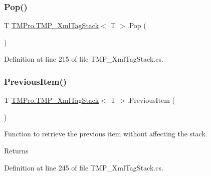 \mbox{\label{struct_t_m_pro_1_1_t_m_p___xml_tag_stack_a5d638de23cccb39bfb43391466559628}} 
\subsubsection{\texorpdfstring{Pop()}{Pop()}}
{\footnotesize\ttfamily T \mbox{\hyperlink{struct_t_m_pro_1_1_t_m_p___xml_tag_stack}{T\+M\+Pro.\+T\+M\+P\+\_\+\+Xml\+Tag\+Stack}}$<$ T $>$.Pop (\begin{DoxyParamCaption}{ }\end{DoxyParamCaption})}



Definition at line 215 of file T\+M\+P\+\_\+\+Xml\+Tag\+Stack.\+cs.

\mbox{\label{struct_t_m_pro_1_1_t_m_p___xml_tag_stack_a3ccea15c0ddf654ce5dd5c186a2d8afc}} 
\subsubsection{\texorpdfstring{PreviousItem()}{PreviousItem()}}
{\footnotesize\ttfamily T \mbox{\hyperlink{struct_t_m_pro_1_1_t_m_p___xml_tag_stack}{T\+M\+Pro.\+T\+M\+P\+\_\+\+Xml\+Tag\+Stack}}$<$ T $>$.Previous\+Item (\begin{DoxyParamCaption}{ }\end{DoxyParamCaption})}



Function to retrieve the previous item without affecting the stack. 

\begin{DoxyReturn}{Returns}

\end{DoxyReturn}


Definition at line 245 of file T\+M\+P\+\_\+\+Xml\+Tag\+Stack.\+cs.

\mbox{\label{struct_t_m_pro_1_1_t_m_p___xml_tag_stack_a4d8f0cc65ddab2c5b902c2afe4d4e3c8}} 
